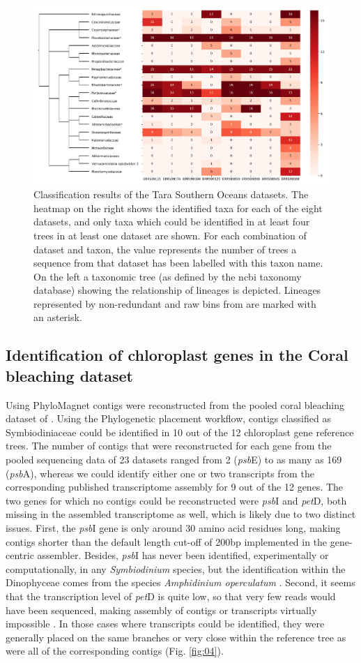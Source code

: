 \documentclass[a4paper]{article}
\begin{document}
\begin{figure}[!tpb]%
\centerline{\includegraphics[width=.7\textwidth]{Fig3.pdf}}
\caption{Classification results of the Tara Southern Oceans datasets. The heatmap on the right shows the identified taxa for each of the eight datasets, and only taxa which could be identified in at least four trees in at least one dataset are shown. For each combination of dataset and taxon, the value represents the number of trees a sequence from that dataset has been labelled with this taxon name. On the left a taxonomic tree (as defined by the ncbi taxonomy database) showing the relationship of lineages is depicted. Lineages represented by non-redundant and raw bins from \citet{Delmont2018} are marked with an asterisk.}\label{fig:03}
\end{figure}

\subsection{Identification of chloroplast genes in the Coral bleaching dataset}
Using PhyloMagnet contigs were reconstructed from the pooled coral bleaching dataset of \citet{Frazier2017}. Using the Phylogenetic placement workflow, contigs classified as Symbiodiniaceae could be identified in 10 out of the 12 chloroplast gene reference trees. The number of contigs that were reconstructed for each gene from the pooled sequencing data of 23 datasets ranged from 2 (\textit{psb}E) to as many as 169 (\textit{psb}A), whereas we could identify either one or two transcripts from the corresponding published transcriptome assembly for 9 out of the 12 genes. The two genes for which no contigs could be reconstructed were \textit{psb}I and \textit{pet}D, both missing in the assembled transcriptome as well, which is likely due to two distinct issues. First, the \textit{psb}I gene is only around 30 amino acid residues long, making contigs shorter than the default length cut-off of 200bp implemented in the gene-centric assembler. Besides, \textit{psb}I has never been identified, experimentally or computationally, in any \textit{Symbiodinium} species, but the identification within the Dinophyceae comes from the species \textit{Amphidinium operculatum} \citep{Nisbet2004,Barbrook2014}. Second, it seems that the transcription level of \textit{pet}D is quite low, so that very few reads would have been sequenced, making assembly of contigs or transcripts virtually impossible \citep{Nisbet2008}. In those cases where transcripts could be identified, they were generally placed on the same branches or very close within the reference tree as were all of the corresponding contigs (Fig. \ref{fig:04}).
\end{document}
